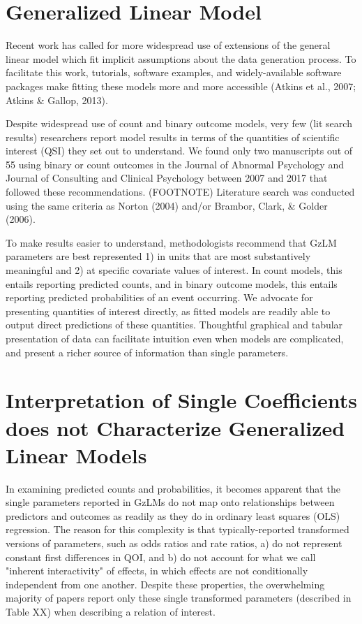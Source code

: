 \documentclass[jou, apacite]{apa6}
\begin{document}
\section{Generalized Linear Model}

Recent work has called for more widespread use of extensions of the general linear model which fit implicit assumptions about the data generation process. 
To facilitate this work, tutorials, software examples, and widely-available software packages make fitting these models more and more accessible (Atkins et al., 2007; Atkins \& Gallop, 2013).

Despite widespread use of count and binary outcome models, very few (lit search results) researchers report model results in terms of the quantities of scientific interest (QSI) they set out to understand. 
We found only two manuscripts out of 55 using binary or count outcomes in the Journal of Abnormal Psychology and Journal of Consulting and Clinical Psychology between 2007 and 2017 that followed these recommendations. (FOOTNOTE) 
Literature search was conducted using the same criteria as Norton (2004) and/or Brambor, Clark, \& Golder (2006). 

To make results easier to understand, methodologists recommend that GzLM parameters are best represented 1) in units that are most substantively meaningful and 2) at specific covariate values of interest.
In count models, this entails reporting predicted counts, and in binary outcome models, this entails reporting predicted probabilities of an event occurring. 
We advocate for presenting quantities of interest directly, as fitted models are readily able to output direct predictions of these quantities. 
Thoughtful graphical and tabular presentation of data can facilitate intuition even when models are complicated, and present a richer source of information than single parameters. 

\section{Interpretation of Single Coefficients does not Characterize Generalized Linear Models}
In examining predicted counts and probabilities, it becomes apparent that the single parameters reported in GzLMs do not map onto relationships between predictors and outcomes as readily as they do in ordinary least squares (OLS) regression. 
The reason for this complexity is that typically-reported transformed versions of parameters, such as odds ratios and rate ratios, a) do not represent constant first differences in QOI, and b) do not account for what we call "inherent interactivity" of effects, in which effects are not conditionally independent from one another. 
Despite these properties, the overwhelming majority of papers report only these single transformed parameters (described in Table XX) when describing a relation of interest.
\end{document}

